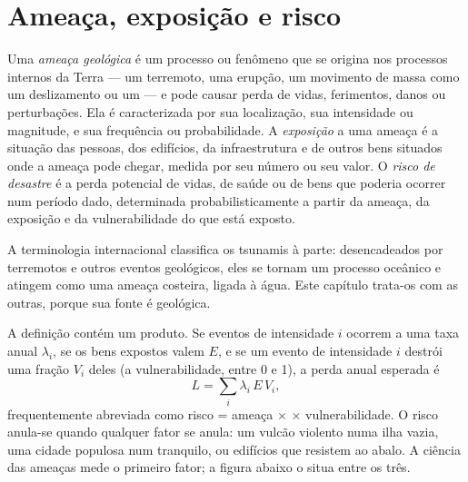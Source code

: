 \section{Ameaça, exposição e risco}\label{sec:b2:geological-hazards:risk}

\begin{definition}\label{def:b2:geological-hazards:risk}
Uma \emph{ameaça geológica} é um processo ou fenômeno que se origina
nos processos internos da Terra --- um terremoto, uma erupção, um movimento de massa como um
deslizamento ou um  --- e pode causar perda de vidas, ferimentos, danos ou perturbações. Ela é
caracterizada por sua localização, sua intensidade ou magnitude, e sua frequência ou probabilidade. A
\emph{exposição} a uma ameaça é a situação das pessoas, dos
edifícios, da infraestrutura e de outros bens situados onde a ameaça pode chegar, medida por seu
número ou seu valor. O \emph{risco de desastre} é a perda potencial de vidas,
de saúde ou de bens que poderia ocorrer num período dado, determinada probabilisticamente a partir da
ameaça, da exposição e da vulnerabilidade do que está exposto.
\end{definition}

A terminologia internacional classifica os tsunamis à parte: desencadeados por terremotos e outros
eventos geológicos, eles se tornam um processo oceânico e atingem como uma ameaça costeira, ligada à água.
Este capítulo trata-os com as outras, porque sua fonte é geológica.

A definição contém um produto. Se eventos de intensidade $i$ ocorrem a uma taxa anual
$\lambda_i$, se os bens expostos valem $E$, e se um evento de intensidade $i$ destrói uma
fração $V_i$ deles (a vulnerabilidade, entre 0 e 1), a perda anual esperada é
\begin{equation}
L = \sum_i \lambda_i \, E \, V_i ,
\label{eq:b2:geological-hazards:loss}
\end{equation}
frequentemente abreviada como risco = ameaça $\times$  $\times$ vulnerabilidade. O risco anula-se quando
qualquer fator se anula: um vulcão violento numa ilha vazia, uma cidade populosa num  tranquilo, ou
edifícios que resistem ao abalo. A ciência das ameaças mede o primeiro fator; a figura abaixo
o situa entre os três.

